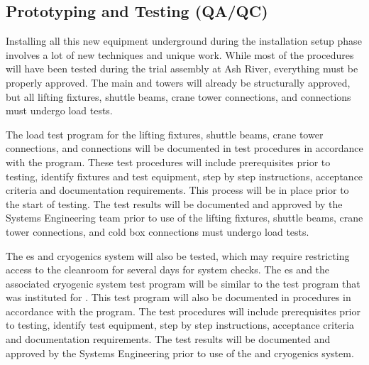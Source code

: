 



\subsection{Prototyping and Testing (QA/QC)}
\label{sec:fdsp-tc-infr-qaqc}


Installing all this new equipment underground during the installation setup phase involves a lot of new techniques  and unique work. While most of the procedures will have been tested during the trial assembly at Ash River, everything must be properly approved. The main  and  towers will already be structurally approved, but all lifting fixtures, shuttle beams, crane tower connections, and \coldbox connections must undergo load tests. 

The load test program for the lifting fixtures, shuttle beams, crane tower connections, and \coldbox connections will be documented in test procedures in accordance with the    program.  
These test procedures will include prerequisites prior to testing, identify fixtures and test equipment, step by step instructions, acceptance criteria and documentation requirements. 
This process  will be in place prior to the start of testing. 
The test results will be documented and approved by the Systems Engineering team prior to use of the lifting fixtures, shuttle beams, crane tower connections, and cold box connections must undergo load tests. 

The \coldbox{}es and cryogenics system will also be tested, which may require restricting  access to the cleanroom  %
for several days for system checks. 
The \coldbox{}es and the associated cryogenic system test program will be similar to the test program that was instituted for . 
This test program will also be documented in procedures in accordance with the    program. The test procedures will include prerequisites prior to testing, identify test equipment, step by step instructions, acceptance criteria and documentation requirements.  The test results will be documented and approved by the Systems Engineering prior to use of the \coldbox and cryogenics system.


\clearpage